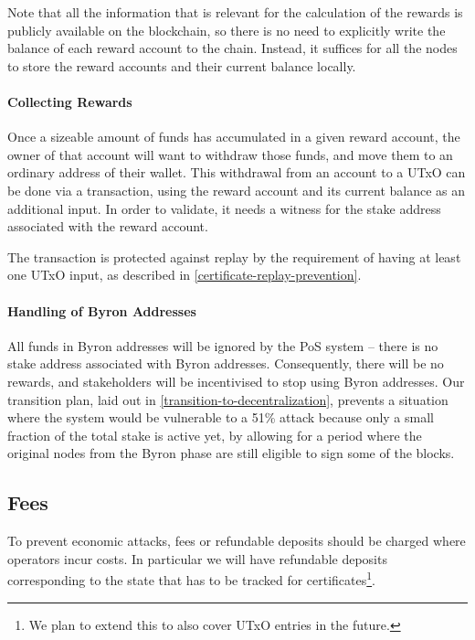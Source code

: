 \documentclass[11pt,a4paper,dvipsnames,twosided]{article}
\begin{document}
Note that all the information that is relevant for the calculation of
the rewards is publicly available on the blockchain, so there is no
need to explicitly write the balance of each reward account to the
chain. Instead, it suffices for all the nodes to store the reward
accounts and their current balance locally.

\paragraph{Collecting Rewards}

Once a sizeable amount of funds has accumulated in a given reward
account, the owner of that account will want to withdraw those funds,
and move them to an ordinary address of their wallet. This withdrawal
from an account to a UTxO can be done via a transaction, using the
reward account and its current balance as an additional input. In order to
validate, it needs a witness for the stake address associated with the reward
account.

The transaction is protected against replay by the requirement of having at
least one UTxO input, as described in \cref{certificate-replay-prevention}.

\paragraph{Handling of Byron Addresses}
\label{handling-of-bootstrap-addresses}

All funds in Byron addresses will be ignored by the PoS system --
there is no stake address associated with Byron
addresses. Consequently, there will be no rewards, and stakeholders
will be incentivised to stop using Byron addresses. Our transition
plan, laid out in \cref{transition-to-decentralization}, prevents a
situation where the system would be vulnerable to a 51\% attack
because only a small fraction of the total stake is active yet, by
allowing for a period where the original nodes from the Byron
phase are still eligible to sign some of the blocks.

\subsection{Fees}
\label{fees}

To prevent economic attacks, fees or refundable deposits should be
charged where operators incur costs. In particular we will have
refundable deposits corresponding to the state that has to be tracked
for certificates\footnote{We plan to extend this to also cover UTxO entries in
  the future.}.
\end{document}
